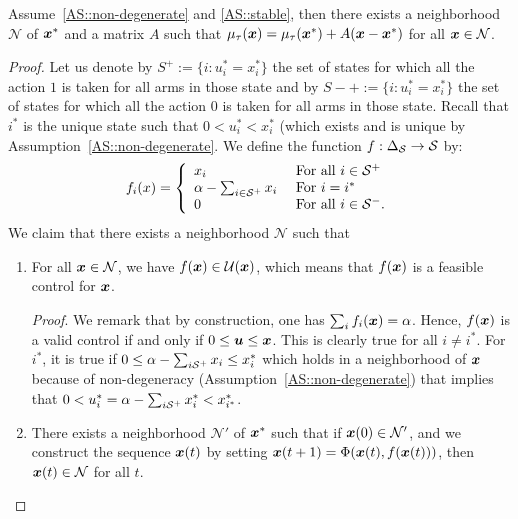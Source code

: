 \begin{lemma}
    \label{lem:locally_linear}
    Assume~\ref{AS::non-degenerate} and \ref{AS::stable}, then there exists a neighborhood $\mathcal{N}$ of ${\bm{x}}^*$ and a matrix $A$ such that $\mu_\tau({\bm{x}}) = \mu_\tau({\bm{x}}^*)+ A({\bm{x}}-{\bm{x}}^*)$ for all ${\bm{x}}\in\mathcal{N}$.
\end{lemma}
\begin{proof}
    Let us denote by $S^+:=\{i : u^*_i=x^*_i\}$ the set of states for which all the action $1$ is taken for all arms in those state and by $S-+:=\{i : u^*_i=x^*_i\}$ the set of states for which all the action $0$ is taken for all arms in those state.
    Recall that $i^*$ is the unique state such that $0<u^*_i < x^*_i$ (which exists and is unique by Assumption~\ref{AS::non-degenerate}.  We define the function $f:\Delta_\mathcal{S}\to\mathcal{S}$ by:
    \begin{align*}
        f_i(x) = 
        \left\{\begin{array}{ll}
             x_i & \text{ For all $i\in\mathcal{S}^+$}  \\
             \alpha - \sum_{i\in\mathcal{S}^+} x_i & \text{ For $i=i^*$}\\
             0 & \text{ For all $i\in\mathcal{S}^-$.}
        \end{array} 
        \right.
    \end{align*}
    We claim that there exists a neighborhood $\mathcal{N}$ such that
    \begin{enumerate}
        \item For all ${\bm{x}}\in\mathcal{N}$, we have $f({\bm{x}})\in\mathcal{U}({\bm{x}})$, which means that $f({\bm{x}})$ is a feasible control for ${\bm{x}}$. 
        
        \emph{Proof}. We remark that by construction, one has $\sum_i f_i({\bm{x}})=\alpha$. Hence, $f({\bm{x}})$ is a valid control if and only if $0\le\bm{u}\le{\bm{x}}$. This is clearly true for all $i\ne i^*$. For $i^*$, it is true if $0\le  \alpha - \sum_{i\mathcal{S}^+} x_i \le x^*_i$ which holds in a neighborhood of ${\bm{x}}$ because of non-degeneracy (Assumption~\ref{AS::non-degenerate}) that implies that $0 < u^*_i = \alpha - \sum_{i\mathcal{S}^+} x^*_i < x^*_{i^*}$.
        \item There exists a neighborhood $\mathcal{N'}$ of ${\bm{x}}^*$ such that if ${\bm{x}}(0)\in\mathcal{N'}$, and we construct the sequence ${\bm{x}}(t)$ by setting ${\bm{x}}(t+1) = \Phi({\bm{x}}(t), f({\bm{x}}(t)))$, then ${\bm{x}}(t)\in\mathcal{N}$ for all $t$.


\end{enumerate}
\end{proof}
